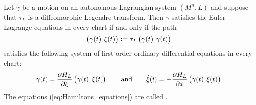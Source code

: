 \begin{theorem}
	\label{thm:Hamiltons_equations}
	Let $\gamma$ be a motion on an autonomous Lagrangian system $(M^n,L)$ and suppose that $\tau_L$ is a diffeomorphic Legendre transform. Then $\gamma$ satisfies the Euler-Lagrange equations in every chart if and only if the path 
	\begin{equation*}
			\del[1]{\gamma(t),\xi(t)} := \tau_L\del[1]{\gamma(t),\dot{\gamma}(t)}
	\end{equation*}
	\noindent satisfies the following system of first order ordinary differential equations in every chart:
	\begin{equation}
		\label{eq:Hamiltons_equations}
		\dot{\gamma}(t) = \frac{\partial H_L}{\partial \xi}\del[1]{\gamma(t),\xi(t)} \qquad \text{and} \qquad \dot{\xi}(t) = -\frac{\partial H_L}{\partial x}\del[1]{\gamma(t),\xi(t)}
	\end{equation}
	The equations \textup{(}\ref{eq:Hamiltons_equations}\textup{)} are called .
\end{theorem}


